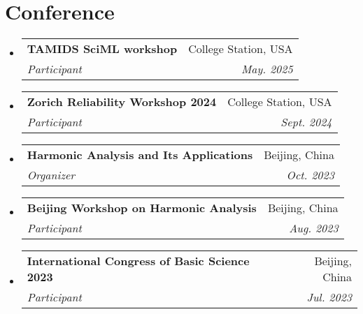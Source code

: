 \documentclass[a4paper,11pt]{article}
\makeatletter
\newcommand{\resumeItem}[2]{
  \item\small{
    \textbf{#1}{: #2 \vspace{-2pt}}
  }
}
\newcommand{\resumeSubheading}[4]{
  \vspace{-1pt}\item
    \begin{tabular*}{0.97\textwidth}{l@{\extracolsep{\fill}}r}
      \textbf{#1} & #2 \\
      \textit{#3} & \textit{#4} \\
    \end{tabular*}\vspace{-5pt}
}
\newcommand{\resumeSubItem}[2]{\resumeItem{#1}{#2}\vspace{-3pt}}
\newcommand{\resumeSubHeadingListStart}{\begin{itemize}[leftmargin=*]}
\newcommand{\resumeSubHeadingListEnd}{\end{itemize}}
\makeatother
\begin{document}

\vspace{1pt}

\section{\bfseries{Conference}}

\resumeSubHeadingListStart

\resumeSubheading
{TAMIDS SciML workshop}{College Station, USA }
{Participant}{May. 2025}
\resumeSubheading
{Zorich Reliability Workshop 2024}{College Station, USA }
{Participant}{Sept. 2024}
\resumeSubheading
{Harmonic Analysis and Its Applications}{Beijing, China}
{Organizer}{Oct. 2023}
\resumeSubheading
{Beijing Workshop on Harmonic Analysis}{Beijing, China}
{Participant}{Aug. 2023}
\resumeSubheading
{International Congress of Basic Science 2023}{Beijing, China}
{Participant}{Jul. 2023}
\resumeSubHeadingListEnd
\end{document}
